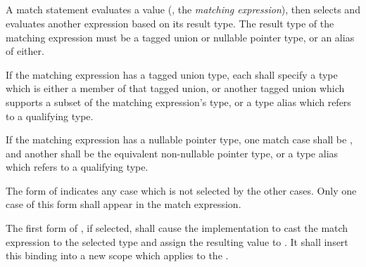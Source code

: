 \begin{grammar}
 \\
	 \terminal{(}  \terminal{)} \terminal{\{}  \terminal{\}} \\

 \\
	 \optional{\terminal{,}} \\
	 \terminal{,}  \\

 \\
	 \terminal{:}  \terminal{=>}  \\
	 \terminal{=>}  \\
	\terminal{*} \terminal{=>}  \\
\end{grammar}

\specsubsubitem
A match statement evaluates a value (, the
\textit{matching expression}), then selects and evaluates another expression
based on its result type. The result type of the matching expression must be a
tagged union or nullable pointer type, or an alias of either.

\specsubsubitem
If the matching expression has a tagged union type, each
 shall specify a type which is either a member of that
tagged union, or another tagged union which supports a subset of the matching
expression's type, or a type alias which refers to a qualifying type.

\specsubsubitem
If the matching expression has a nullable pointer type, one match case shall be
, and another shall be the equivalent non-nullable pointer type,
or a type alias which refers to a qualifying type.

\specsubsubitem
The \terminal{*} form of  indicates any case which is
not selected by the other cases. Only one case of this form shall appear in the
match expression.

\specsubsubitem
The first form of , if selected, shall cause the
implementation to cast the match expression to the selected type and assign the
resulting value to . It shall insert this binding into a new
scope which applies to the .

